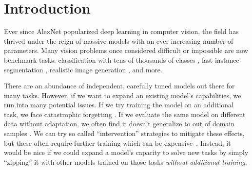 \section{Introduction}
\vspace{-0.4em}
Ever since AlexNet \cite{krizhevsky2017imagenet} popularized deep learning in computer vision, the field has thrived under the reign of massive models with an ever increasing number of parameters. 
Many
vision problems once considered difficult or impossible are now benchmark tasks: classification with tens of thousands of classes \cite{deng2009imagenet,zhou2017scene,gemmeke2017audio}, 
fast instance segmentation \cite{he2017mask,bolya2019yolact}, realistic image generation \cite{karras2018style,ho2020denoising,rombach2022high}, and more.

There are an abundance of independent, carefully tuned models out there for many tasks.
However, if we want to expand an existing model's capabilities, we run into many potential issues. If we try training the model on an additional task, we face catastrophic forgetting \cite{kirkpatrick2017overcoming,li2017learning,de2021continual}. If we evaluate the same model on different data without adaptation, we often find it doesn't generalize to out of domain samples \cite{blanchard2011generalizing,muandet2013domain,wang2022generalizing}. We can try so called ``intervention'' strategies \cite{wang2022generalizing,de2021continual} to mitigate these effects, but these often require further training which can be expensive~\cite{dosovitskiy2020image,zhai2022scaling,dehghani2023scalingvit22b}. 
Instead, it would be nice if we could expand a model's capacity to solve new tasks by simply ``zipping'' it with other models trained on those tasks \textit{without additional training}.




